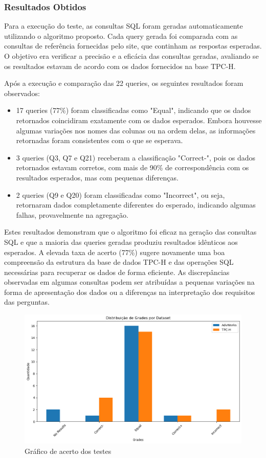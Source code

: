 \documentclass{article}
\begin{document}
\subsubsection{Resultados Obtidos}

\hspace*{1em} Para a execução do teste, as consultas SQL foram geradas automaticamente utilizando o algoritmo proposto. Cada query gerada foi comparada com as consultas de referência fornecidas pelo site, que continham as respostas esperadas. O objetivo era verificar a precisão e a eficácia das consultas geradas, avaliando se os resultados estavam de acordo com os dados fornecidos na base TPC-H.

Após a execução e comparação das 22 queries, os seguintes resultados foram observados:

\begin{itemize} 
\item 17 queries (77\%) foram classificadas como "Equal", indicando que os dados retornados coincidiram exatamente com os dados esperados. Embora houvesse algumas variações nos nomes das colunas ou na ordem delas, as informações retornadas foram consistentes com o que se esperava. 
\item 3 queries (Q3, Q7 e Q21) receberam a classificação "Correct-", pois os dados retornados estavam corretos, com mais de 90\% de correspondência com os resultados esperados, mas com pequenas diferenças. 
\item 2 queries (Q9 e Q20) foram classificadas como "Incorrect", ou seja, retornaram dados completamente diferentes do esperado, indicando algumas falhas, provavelmente na agregação. \end{itemize}

Estes resultados demonstram que o algoritmo foi eficaz na geração das consultas SQL e que a maioria das queries geradas produziu resultados idênticos aos esperados. A elevada taxa de acerto (77\%) sugere novamente uma boa compreensão da estrutura da base de dados TPC-H e das operações SQL necessárias para recuperar os dados de forma eficiente. As discrepâncias observadas em algumas consultas podem ser atribuídas a pequenas variações na forma de apresentação dos dados ou a diferenças na interpretação dos requisitos das perguntas.

\begin{figure}[ht]
    \centering
    \includegraphics[width=0.75\linewidth]{comparResults.png}
    \caption{Gráfico de acerto dos testes}
    \label{fig:enter-label}
\end{figure}
\end{document}
